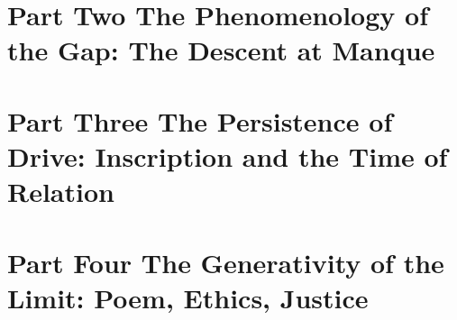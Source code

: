 \part*{\textcolor{rosedeep}{Part Two \quad The Phenomenology of the Gap: The Descent at Manque}}


\part*{\textcolor{rosedeep}{Part Three \quad The Persistence of Drive: Inscription and the Time of Relation}}


\part*{\textcolor{rosedeep}{Part Four \quad The Generativity of the Limit: Poem, Ethics, Justice}}

